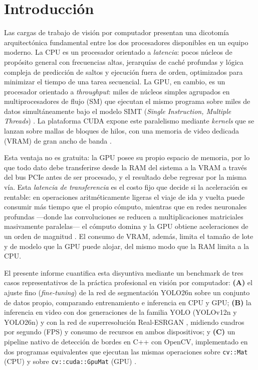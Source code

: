 \section{Introducción}

Las cargas de trabajo de visión por computador presentan una dicotomía
arquitectónica fundamental entre los dos procesadores disponibles en un equipo
moderno. La CPU es un procesador orientado a \emph{latencia}: pocos núcleos de
propósito general con frecuencias altas, jerarquías de caché profundas y lógica
compleja de predicción de saltos y ejecución fuera de orden, optimizados para
minimizar el tiempo de una tarea secuencial. La GPU, en cambio, es un procesador
orientado a \emph{throughput}: miles de núcleos simples agrupados en
multiprocesadores de flujo (SM) que ejecutan el mismo programa sobre miles de
datos simultáneamente bajo el modelo SIMT (\emph{Single Instruction, Multiple
Threads}) \cite{Owens2008}. La plataforma CUDA expone este paralelismo mediante
\emph{kernels} que se lanzan sobre mallas de bloques de hilos, con una memoria
de video dedicada (VRAM) de gran ancho de banda \cite{NVIDIA_CUDA}.

Esta ventaja no es gratuita: la GPU posee su propio espacio de memoria, por lo
que todo dato debe transferirse desde la RAM del sistema a la VRAM a través del
bus PCIe antes de ser procesado, y el resultado debe regresar por la misma vía.
Esta \emph{latencia de transferencia} es el costo fijo que decide si la
aceleración es rentable: en operaciones aritméticamente ligeras el viaje de ida
y vuelta puede consumir más tiempo que el propio cómputo, mientras que en redes
neuronales profundas ---donde las convoluciones se reducen a multiplicaciones
matriciales masivamente paralelas--- el cómputo domina y la GPU obtiene
aceleraciones de un orden de magnitud \cite{Paszke2019}. El consumo de VRAM,
además, limita el tamaño de lote y de modelo que la GPU puede alojar, del mismo
modo que la RAM limita a la CPU.

El presente informe cuantifica esta disyuntiva mediante un benchmark de tres
casos representativos de la práctica profesional en visión por computador:
\textbf{(A)} el ajuste fino (\emph{fine-tuning}) de la red de segmentación
YOLO26n sobre un conjunto de datos propio, comparando entrenamiento e
inferencia en CPU y GPU; \textbf{(B)} la inferencia en video con dos
generaciones de la familia YOLO (YOLOv12n y YOLO26n) y con la red de
superresolución Real-ESRGAN \cite{Wang2021}, midiendo cuadros por segundo (FPS)
y consumo de recursos en ambos dispositivos; y \textbf{(C)} un pipeline nativo
de detección de bordes en C++ con OpenCV, implementado en dos programas
equivalentes que ejecutan las mismas operaciones sobre \texttt{cv::Mat} (CPU) y
sobre \texttt{cv::cuda::GpuMat} (GPU) \cite{OpenCV_CUDA}.

